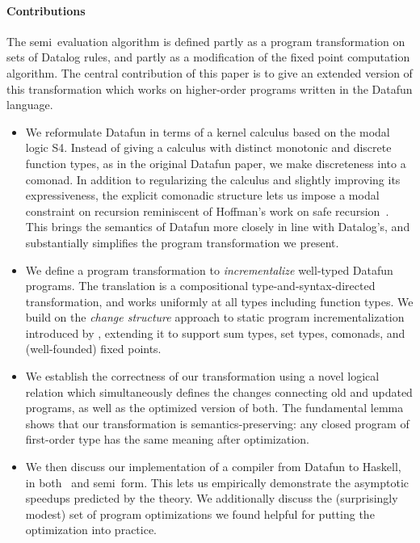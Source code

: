\paragraph{Contributions} The semi\naive\ evaluation algorithm is
defined partly as a program transformation on sets of Datalog rules,
and partly as a modification of the fixed point computation algorithm.
The central contribution of this paper is to give an extended version
of this transformation which works on higher-order programs written
in the Datafun language. 

\begin{itemize}
\item We reformulate Datafun in terms of a kernel calculus based on
  the modal logic S4. Instead of giving a calculus with distinct
  monotonic and discrete function types, as in the original Datafun
  paper, we make discreteness into a comonad. In addition to
  regularizing the calculus and slightly improving its expressiveness,
  the explicit comonadic structure lets us impose a modal constraint
  on recursion reminiscent of Hoffman's work on safe
  recursion~\cite{hofmann-safe-recursion}. This brings the semantics
  of Datafun more closely in line with Datalog's, and substantially
  simplifies the program transformation we present.
  
\item We define a program transformation to \emph{incrementalize}
  well-typed Datafun programs. The translation is a compositional
  type-and-syntax-directed transformation, and works uniformly at all
  types including function types. We build on the \emph{change
    structure} approach to static program incrementalization
  introduced by \citet{incremental}, extending it to support sum
  types, set types, comonads, and (well-founded) fixed points.

\item We establish the correctness of our transformation using a novel
  logical relation which simultaneously defines the changes connecting
  old and updated programs, as well as the optimized version of both.
  The fundamental lemma shows that our transformation is
  semantics-preserving: any closed program of first-order type has the
  same meaning after optimization.
  
\item We then discuss our implementation of a compiler from Datafun to
  Haskell, in both \naive\ and semi\naive\ form. This lets us
  empirically demonstrate the asymptotic speedups predicted by the
  theory. We additionally discuss the (surprisingly modest) set of
  program optimizations we found helpful for putting the optimization
  into practice.
\end{itemize}
